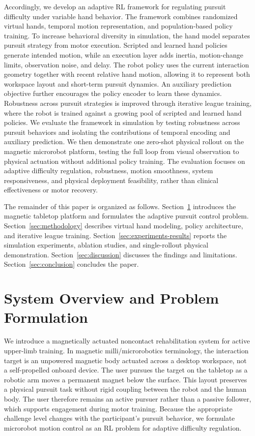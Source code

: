 \documentclass[journal,twoside,web]{ieeecolor2}
\begin{document}
Accordingly, we develop an adaptive RL framework for regulating pursuit difficulty under variable hand behavior. The framework combines randomized virtual hands, temporal motion representation, and population-based policy training. To increase behavioral diversity in simulation, the hand model separates pursuit strategy from motor execution. Scripted and learned hand policies generate intended motion, while an execution layer adds inertia, motion-change limits, observation noise, and delay. The robot policy uses the current interaction geometry together with recent relative hand motion, allowing it to represent both workspace layout and short-term pursuit dynamics. An auxiliary prediction objective further encourages the policy encoder to learn these dynamics. Robustness across pursuit strategies is improved through iterative league training, where the robot is trained against a growing pool of scripted and learned hand policies. We evaluate the framework in simulation by testing robustness across pursuit behaviors and isolating the contributions of temporal encoding and auxiliary prediction. We then demonstrate one zero-shot physical rollout on the magnetic microrobot platform, testing the full loop from visual observation to physical actuation without additional policy training. The evaluation focuses on adaptive difficulty regulation, robustness, motion smoothness, system responsiveness, and physical deployment feasibility, rather than clinical effectiveness or motor recovery.

The remainder of this paper is organized as follows. Section~\ref{sec:system-overview} introduces the magnetic tabletop platform and formulates the adaptive pursuit control problem. Section~\ref{sec:methodology} describes virtual hand modeling, policy architecture, and iterative league training. Section~\ref{sec:experiments-results} reports the simulation experiments, ablation studies, and single-rollout physical demonstration. Section~\ref{sec:discussion} discusses the findings and limitations. Section~\ref{sec:conclusion} concludes the paper.

\section{System Overview and Problem Formulation}
\label{sec:system-overview}
We introduce a magnetically actuated noncontact rehabilitation system for active upper-limb training. In magnetic milli/microrobotics terminology, the interaction target is an unpowered magnetic body actuated across a desktop workspace, not a self-propelled onboard device. The user pursues the target on the tabletop as a robotic arm moves a permanent magnet below the surface. This layout preserves a physical pursuit task without rigid coupling between the robot and the human body. The user therefore remains an active pursuer rather than a passive follower, which supports engagement during motor training. Because the appropriate challenge level changes with the participant's pursuit behavior, we formulate microrobot motion control as an RL problem for adaptive difficulty regulation.
\end{document}
